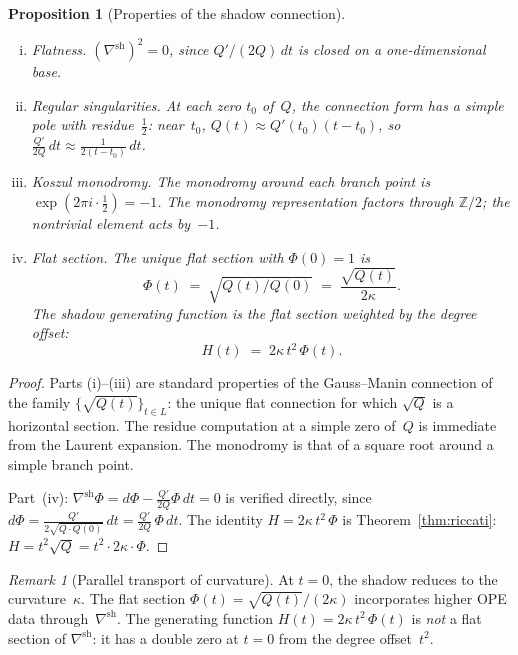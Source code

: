 \documentclass[11pt]{article}
\theoremstyle{plain}
\newtheorem{proposition}[theorem]{Proposition}
\theoremstyle{definition}
\theoremstyle{remark}
\newtheorem{remark}[theorem]{Remark}
\begin{document}
\begin{proposition}[Properties of the shadow connection]
\label{prop:conn-properties}
\leavevmode
\begin{enumerate}[(i)]
\item \emph{Flatness.}\enspace
 $(\nabla^{\mathrm{sh}})^2 = 0$, since
 $Q'/(2Q)\,dt$ is closed on a one-dimensional base.

\item \emph{Regular singularities.}\enspace
 At each zero $t_0$ of~$Q$, the connection form has
 a simple pole with residue~$\tfrac{1}{2}$:
 near~$t_0$, $Q(t) \approx Q'(t_0)(t - t_0)$, so
 $\frac{Q'}{2Q}\,dt \approx \frac{1}{2(t-t_0)}\,dt$.

\item \emph{Koszul monodromy.}\enspace
 The monodromy around each branch point is
 $\exp(2\pi i \cdot \tfrac{1}{2}) = -1$.
 The monodromy representation factors through
 $\mathbb{Z}/2$; the nontrivial element acts by~$-1$.

\item \emph{Flat section.}\enspace
 The unique flat section with $\Phi(0) = 1$ is
 \begin{equation}\label{eq:flat-section}
 \Phi(t)
 \;=\; \sqrt{Q(t)/Q(0)}
 \;=\; \frac{\sqrt{Q(t)}}{2\kappa}.
 \end{equation}
 The shadow generating function is the flat section
 weighted by the degree offset:
 \begin{equation}\label{eq:H-from-Phi}
 H(t) \;=\; 2\kappa\,t^2\,\Phi(t).
 \end{equation}
\end{enumerate}
\end{proposition}

\begin{proof}
Parts (i)--(iii) are standard properties of the Gauss--Manin
connection of the family $\{\sqrt{Q(t)}\}_{t \in L}$:
the unique flat connection for which $\sqrt{Q}$ is a horizontal
section. The residue computation at a simple zero of~$Q$ is
immediate from the Laurent expansion. The monodromy is that
of a square root around a simple branch point.

Part~(iv): $\nabla^{\mathrm{sh}}\Phi
= d\Phi - \frac{Q'}{2Q}\Phi\,dt = 0$ is verified directly,
since $d\Phi = \frac{Q'}{2\sqrt{Q \cdot Q(0)}}\,dt
= \frac{Q'}{2Q}\,\Phi\,dt$.
The identity $H = 2\kappa\,t^2\,\Phi$ is
Theorem~\ref{thm:riccati}: $H = t^2\sqrt{Q}
= t^2 \cdot 2\kappa \cdot \Phi$.
\end{proof}

\begin{remark}[Parallel transport of curvature]
\label{rem:parallel-transport}
At $t = 0$, the shadow reduces to the curvature~$\kappa$.
The flat section $\Phi(t) = \sqrt{Q(t)}/(2\kappa)$ incorporates
higher OPE data through~$\nabla^{\mathrm{sh}}$.
The generating function $H(t) = 2\kappa\,t^2\,\Phi(t)$
is \emph{not} a flat section of $\nabla^{\mathrm{sh}}$: it has
a double zero at $t = 0$ from the degree offset~$t^2$.
\end{remark}
\end{document}
